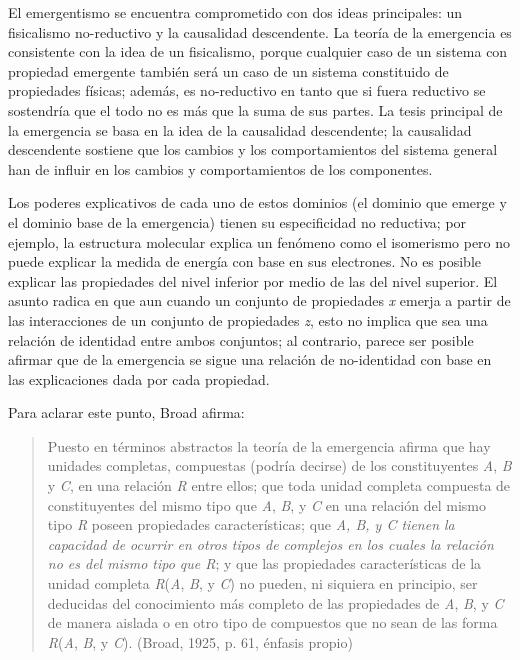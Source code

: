 \documentclass[]{book}
\begin{document}
\begin{refsection}
El emergentismo se encuentra comprometido con dos ideas principales: un
fisicalismo no-reductivo y la causalidad descendente. La teoría de la
emergencia es consistente con la idea de un fisicalismo, porque
cualquier caso de un sistema con propiedad emergente también será un
caso de un sistema constituido de propiedades físicas; además, es
no-reductivo en tanto que si fuera reductivo se sostendría que el todo
no es más que la suma de sus partes. La tesis principal de la emergencia
se basa en la idea de la causalidad descendente; la causalidad
descendente sostiene que los cambios y los comportamientos del sistema
general han de influir en los cambios y comportamientos de los
componentes.

Los poderes explicativos de cada uno de estos dominios (el dominio que
emerge y el dominio base de la emergencia) tienen su especificidad no
reductiva; por ejemplo, la estructura molecular explica un fenómeno como
el isomerismo pero no puede explicar la medida de energía con base en
sus electrones. No es posible explicar las propiedades del nivel
inferior por medio de las del nivel superior. El asunto radica en que
aun cuando un conjunto de propiedades \emph{x} emerja a partir de las
interacciones de un conjunto de propiedades \emph{z}, esto no implica
que sea una relación de identidad entre ambos conjuntos; al contrario,
parece ser posible afirmar que de la emergencia se sigue una relación de
no-identidad con base en las explicaciones dada por cada propiedad.

Para aclarar este punto, Broad afirma:

\begin{quote}
Puesto en términos abstractos la teoría de la emergencia afirma que hay
unidades completas, compuestas (podría decirse) de los constituyentes
\emph{A}, \emph{B} y \emph{C}, en una relación \emph{R} entre ellos; que
toda unidad completa compuesta de constituyentes del mismo tipo que
\emph{A}, \emph{B}, y \emph{C} en una relación del mismo tipo \emph{R}
poseen propiedades características; que \emph{A, B, y C tienen la
capacidad de ocurrir en otros tipos de complejos en los cuales la
relación no es del mismo tipo que R}; y que las propiedades
características de la unidad completa \emph{R}(\emph{A}, \emph{B}, y
\emph{C}) no pueden, ni siquiera en principio, ser deducidas del
conocimiento más completo de las propiedades de \emph{A}, \emph{B}, y
\emph{C} de manera aislada o en otro tipo de compuestos que no sean de
las forma \emph{R}(\emph{A}, \emph{B}, y \emph{C}). (Broad, 1925, p. 61,
énfasis propio)
\end{quote}


\end{refsection}
\end{document}
